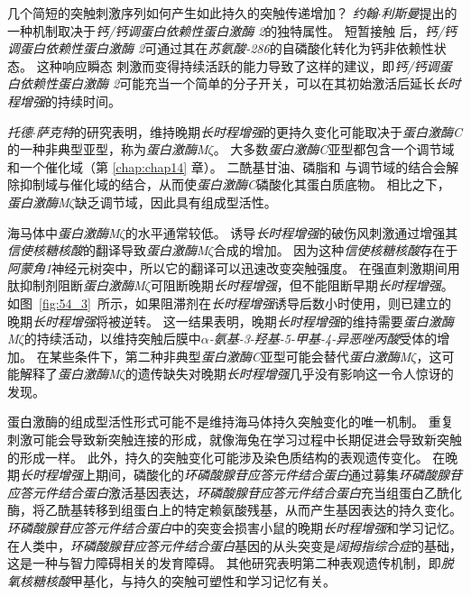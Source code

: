 几个简短的突触刺激序列如何产生如此持久的突触传递增加？
\textit{约翰$\cdot$利斯曼}提出的一种机制取决于\textit{钙/钙调蛋白依赖性蛋白激酶 2}的独特属性。
短暂接触  后，\textit{钙/钙调蛋白依赖性蛋白激酶 2}可通过其在\textit{苏氨酸-286}的自磷酸化转化为钙非依赖性状态。
这种响应瞬态  刺激而变得持续活跃的能力导致了这样的建议，即\textit{钙/钙调蛋白依赖性蛋白激酶 2}可能充当一个简单的分子开关，可以在其初始激活后延长\textit{长时程增强}的持续时间。


\textit{托德$\cdot$萨克特}的研究表明，维持晚期\textit{长时程增强}的更持久变化可能取决于\textit{蛋白激酶C}的一种非典型亚型，称为\textit{蛋白激酶M$\zeta$}。
大多数\textit{蛋白激酶C}亚型都包含一个调节域和一个催化域（第 \ref{chap:chap14} 章）。
二酰基甘油、磷脂和  与调节域的结合会解除抑制域与催化域的结合，从而使\textit{蛋白激酶C}磷酸化其蛋白质底物。
相比之下，\textit{蛋白激酶M$\zeta$}缺乏调节域，因此具有组成型活性。


海马体中\textit{蛋白激酶M$\zeta$}的水平通常较低。
诱导\textit{长时程增强}的破伤风刺激通过增强其\textit{信使核糖核酸}的翻译导致\textit{蛋白激酶M$\zeta$}合成的增加。
因为这种\textit{信使核糖核酸}存在于\textit{阿蒙角1}神经元树突中，所以它的翻译可以迅速改变突触强度。
在强直刺激期间用肽抑制剂阻断\textit{蛋白激酶M$\zeta$}可阻断晚期\textit{长时程增强}，但不能阻断早期\textit{长时程增强}。
如图~\ref{fig:54_3}~所示，如果阻滞剂在\textit{长时程增强}诱导后数小时使用，则已建立的晚期\textit{长时程增强}将被逆转。
这一结果表明，晚期\textit{长时程增强}的维持需要\textit{蛋白激酶M$\zeta$}的持续活动，以维持突触后膜中\textit{$\alpha$-氨基-3-羟基-5-甲基-4-异恶唑丙酸}受体的增加。
在某些条件下，第二种非典型\textit{蛋白激酶C}亚型可能会替代\textit{蛋白激酶M$\zeta$}，这可能解释了\textit{蛋白激酶M$\zeta$}的遗传缺失对晚期\textit{长时程增强}几乎没有影响这一令人惊讶的发现。


蛋白激酶的组成型活性形式可能不是维持海马体持久突触变化的唯一机制。
重复刺激可能会导致新突触连接的形成，就像海兔在学习过程中长期促进会导致新突触的形成一样。
此外，持久的突触变化可能涉及染色质结构的表观遗传变化。
在晚期\textit{长时程增强}上期间，磷酸化的\textit{环磷酸腺苷应答元件结合蛋白}通过募集\textit{环磷酸腺苷应答元件结合蛋白}激活基因表达，\textit{环磷酸腺苷应答元件结合蛋白}充当组蛋白乙酰化酶，将乙酰基转移到组蛋白上的特定赖氨酸残基，从而产生基因表达的持久变化。
\textit{环磷酸腺苷应答元件结合蛋白}中的突变会损害小鼠的晚期\textit{长时程增强}和学习记忆。
在人类中，\textit{环磷酸腺苷应答元件结合蛋白}基因的从头突变是\textit{阔拇指综合症}的基础，这是一种与智力障碍相关的发育障碍。
其他研究表明第二种表观遗传机制，即\textit{脱氧核糖核酸}甲基化，与持久的突触可塑性和学习记忆有关。



